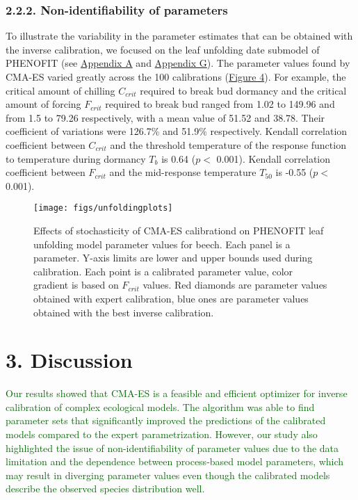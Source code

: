 \documentclass[11pt,]{article}
\begin{document}
\hypertarget{non-identifiability-of-parameters}{%
\subsubsection{2.2.2. Non-identifiability of
parameters}\label{non-identifiability-of-parameters}}

To illustrate the variability in the parameter estimates that can be
obtained with the inverse calibration, we focused on the leaf unfolding
date submodel of PHENOFIT (see \protect\hyperlink{appendixA}{Appendix A}
and \protect\hyperlink{appendixG}{Appendix G}). The parameter values
found by CMA-ES varied greatly across the 100 calibrations
(\hyperref[fig:unfoldingplots]{Figure 4}). For example, the critical
amount of chilling \(C_{crit}\) required to break bud dormancy and the
critical amount of forcing \(F_{crit}\) required to break bud ranged
from 1.02 to 149.96 and from 1.5 to 79.26 respectively, with a mean
value of 51.52 and 38.78. Their coefficient of variations were 126.7\%
and 51.9\% respectively. Kendall correlation coefficient between
\(C_{crit}\) and the threshold temperature of the response function to
temperature during dormancy \(T_b\) is 0.64 (\(p <\) 0.001). Kendall
correlation coefficient between \(F_{crit}\) and the mid-response
temperature \(T_{50}\) is -0.55 (\(p <\) 0.001).

\begin{figure}[H]

{\centering \texttt{[image: figs/unfoldingplots]} 

}

\caption{Effects of stochasticity of CMA-ES calibrationd on PHENOFIT leaf unfolding model parameter values for beech. Each panel is a parameter. Y-axis limits are lower and upper bounds used during calibration. Each point is a calibrated parameter value, color gradient is based on $F_{crit}$ values. Red diamonds are parameter values obtained with expert calibration, blue ones are parameter values obtained with the best inverse calibration.}\label{fig:unfoldingplots}
\end{figure}

\hypertarget{discussion}{%
\section{3. Discussion}\label{discussion}}

\textcolor{darkgreen}{Our results showed that CMA-ES is a feasible and efficient optimizer for inverse calibration of complex ecological models. The algorithm was able to find parameter sets that significantly improved the predictions of the calibrated models compared to the expert parametrization.  However, our study also highlighted the issue of non-identifiability of parameter values due to the data limitation and the dependence between process-based model parameters, which may result in diverging parameter values even though the calibrated models describe the observed species distribution well.}
\end{document}
